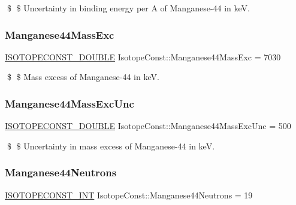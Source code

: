 \$ \$ Uncertainty in binding energy per A of Manganese-\/44 in keV. \mbox{\label{group___isotope_const-_manganese-_mn44_gac8743dd6fab402e531d4abf845dc8dc0}} 
\subsubsection{\texorpdfstring{Manganese44\+Mass\+Exc}{Manganese44MassExc}}
{\footnotesize\ttfamily \mbox{\hyperlink{group___isotope_const-_macros_ga8f45a7272ce02c0b4c65c44636ed719a}{I\+S\+O\+T\+O\+P\+E\+C\+O\+N\+S\+T\+\_\+\+D\+O\+U\+B\+LE}} Isotope\+Const\+::\+Manganese44\+Mass\+Exc = 7030}

\$ \$ Mass excess of Manganese-\/44 in keV. \mbox{\label{group___isotope_const-_manganese-_mn44_ga6921fca02e10ad76596446697c5c2e67}} 
\subsubsection{\texorpdfstring{Manganese44\+Mass\+Exc\+Unc}{Manganese44MassExcUnc}}
{\footnotesize\ttfamily \mbox{\hyperlink{group___isotope_const-_macros_ga8f45a7272ce02c0b4c65c44636ed719a}{I\+S\+O\+T\+O\+P\+E\+C\+O\+N\+S\+T\+\_\+\+D\+O\+U\+B\+LE}} Isotope\+Const\+::\+Manganese44\+Mass\+Exc\+Unc = 500}

\$ \$ Uncertainty in mass excess of Manganese-\/44 in keV. \mbox{\label{group___isotope_const-_manganese-_mn44_ga126ec899ce09d9805a9a1094055109e6}} 
\subsubsection{\texorpdfstring{Manganese44\+Neutrons}{Manganese44Neutrons}}
{\footnotesize\ttfamily \mbox{\hyperlink{group___isotope_const-_macros_ga5f18360b3e99483a35c32d789e62621c}{I\+S\+O\+T\+O\+P\+E\+C\+O\+N\+S\+T\+\_\+\+I\+NT}} Isotope\+Const\+::\+Manganese44\+Neutrons = 19}

